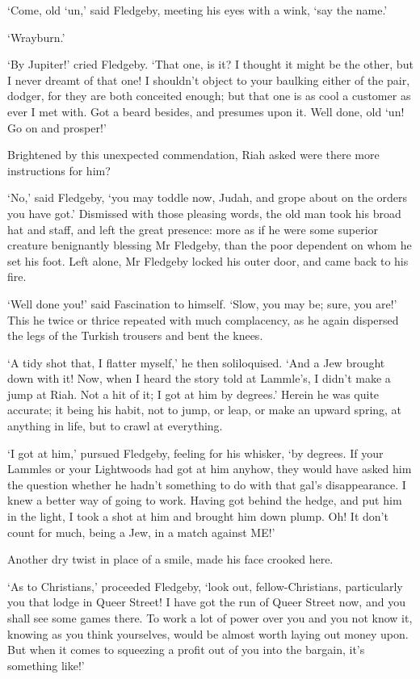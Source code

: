 ‘Come, old ‘un,’ said Fledgeby, meeting his eyes with a wink, ‘say the
name.’

‘Wrayburn.’

‘By Jupiter!’ cried Fledgeby. ‘That one, is it? I thought it might be
the other, but I never dreamt of that one! I shouldn’t object to your
baulking either of the pair, dodger, for they are both conceited enough;
but that one is as cool a customer as ever I met with. Got a beard
besides, and presumes upon it. Well done, old ‘un! Go on and prosper!’

Brightened by this unexpected commendation, Riah asked were there more
instructions for him?

‘No,’ said Fledgeby, ‘you may toddle now, Judah, and grope about on the
orders you have got.’ Dismissed with those pleasing words, the old man
took his broad hat and staff, and left the great presence: more as if he
were some superior creature benignantly blessing Mr Fledgeby, than the
poor dependent on whom he set his foot. Left alone, Mr Fledgeby locked
his outer door, and came back to his fire.

‘Well done you!’ said Fascination to himself. ‘Slow, you may be; sure,
you are!’ This he twice or thrice repeated with much complacency, as he
again dispersed the legs of the Turkish trousers and bent the knees.

‘A tidy shot that, I flatter myself,’ he then soliloquised. ‘And a Jew
brought down with it! Now, when I heard the story told at Lammle’s, I
didn’t make a jump at Riah. Not a hit of it; I got at him by degrees.’
Herein he was quite accurate; it being his habit, not to jump, or
leap, or make an upward spring, at anything in life, but to crawl at
everything.

‘I got at him,’ pursued Fledgeby, feeling for his whisker, ‘by degrees.
If your Lammles or your Lightwoods had got at him anyhow, they would
have asked him the question whether he hadn’t something to do with that
gal’s disappearance. I knew a better way of going to work. Having got
behind the hedge, and put him in the light, I took a shot at him and
brought him down plump. Oh! It don’t count for much, being a Jew, in a
match against ME!’

Another dry twist in place of a smile, made his face crooked here.

‘As to Christians,’ proceeded Fledgeby, ‘look out, fellow-Christians,
particularly you that lodge in Queer Street! I have got the run of Queer
Street now, and you shall see some games there. To work a lot of power
over you and you not know it, knowing as you think yourselves, would
be almost worth laying out money upon. But when it comes to squeezing a
profit out of you into the bargain, it’s something like!’

